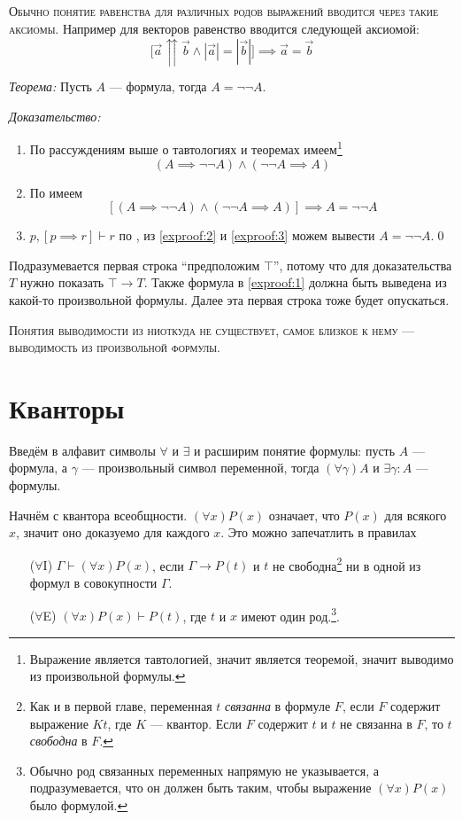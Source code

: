 \textsc{Обычно понятие равенства для различных родов выражений
	вводится через такие аксиомы.}
Например для векторов равенство вводится следующей аксиомой:
\[
	\big[\vec{a}\upuparrows\vec{b}\land|\vec{a}|=|\vec{b}|\big]
	\implies \vec{a}=\vec{b}
\]

{\it Теорема:} Пусть $A$ --- формула, тогда $A=\lnot\lnot A$.

	{\it Доказательство:}
\begin{enumerate}[label=(\arabic*)]
	\item{}По рассуждениям выше о тавтологиях и теоремах
	имеем\footnote{Выражение является тавтологией, значит является теоремой,
		значит выводимо из произвольной формулы.}
	\[
		(A\implies \lnot\lnot A)\land (\lnot\lnot A\implies A)
	\]
	\label{exproof:2}

	\item{}По \axiom{} имеем
	\label{exproof:3}
	\[
		[(A\implies \lnot\lnot A)\land (\lnot\lnot A\implies A)]\implies A=\lnot\lnot A
	\]
	\item{}${p,[p\implies r]\vdash r}$ по \taut{},
	из \ref{exproof:2} и \ref{exproof:3}
	можем вывести $A=\lnot\lnot A$.\qed
\end{enumerate}

Подразумевается первая строка ``предположим $\top$'', потому что для доказательства
$T$ нужно показать $\top\to T$. Также формула в \ref{exproof:1} должна быть выведена
из какой-то произвольной формулы. Далее эта первая строка тоже будет опускаться.

\textsc{Понятия выводимости из ниоткуда не существует,
	самое близкое к нему --- выводимость из произвольной формулы.}

\section{Кванторы}

\newcommand\Aii{$\forall$I}
\newcommand\Aee{$\forall$E}
\newcommand\Eii{$\exists$I}
\newcommand\Eee{$\exists$E}

Введём в алфавит символы $\forall$ и $\exists$ и расширим понятие формулы:
пусть $A$ --- формула, а $\gamma$ --- произвольный символ переменной,
тогда $(\forall\gamma)A$ и $\exists\gamma:A$ --- формулы.

Начнём с квантора всеобщности. $(\forall x)P(x)$ означает, что $P(x)$ для
всякого $x$, значит оно доказуемо для каждого $x$. Это можно запечатлить
в правилах
\begin{enumerate}
	\item[(\Aii{})]{}$\Gamma\vdash(\forall x)P(x)$, если $\Gamma\to P(t)$ и $t$
	не свободна\footnote{
		Как и в первой главе, переменная $t$ {\it связанна} в формуле $F$,
		если $F$ содержит
		выражение $Kt$, где $K$ --- квантор. Если $F$ содержит $t$ и $t$ не связанна
		в $F$, то $t$ {\it свободна} в $F$.
	} ни в одной из формул в совокупности $\Gamma$.

	\item[(\Aee{})]{}$(\forall x)P(x)\vdash P(t)$, где $t$ и $x$
	имеют один род.\footnote{
		Обычно род связанных переменных напрямую не указывается, а подразумевается,
		что он должен быть таким, чтобы выражение $(\forall x)P(x)$ было формулой.
	}.
\end{enumerate}

